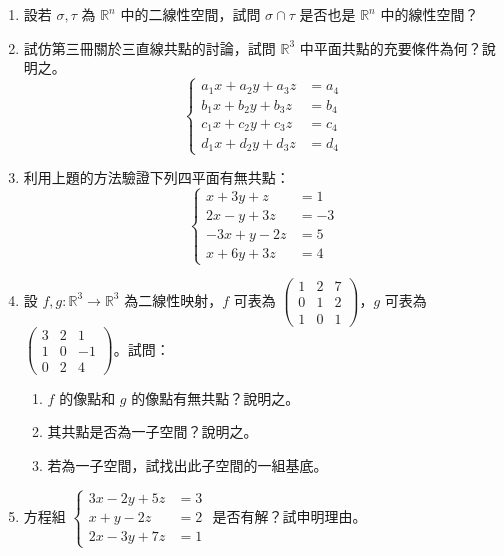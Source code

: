 \begin{enumerate}[label=\arabic*., leftmargin=2em]
  \item[\textbf{**11.}] 設若 $\sigma, \tau$ 為 $\mathbb{R}^n$ 中的二線性空間，試問 $\sigma \cap \tau$ 是否也是 $\mathbb{R}^n$ 中的線性空間？

  \item 試仿第三冊關於三直線共點的討論，試問 $\mathbb{R}^3$ 中平面共點的充要條件為何？說明之。
  \[ \left\{\begin{aligned}
  a_1x + a_2y + a_3z &= a_4 \\
  b_1x + b_2y + b_3z &= b_4 \\
  c_1x + c_2y + c_3z &= c_4 \\
  d_1x + d_2y + d_3z &= d_4
  \end{aligned}\right. \]

  \item 利用上題的方法驗證下列四平面有無共點：
  \[ \left\{\begin{aligned}
  x + 3y + z &= 1 \\
  2x - y + 3z &= -3 \\
  -3x + y - 2z &= 5 \\
  x + 6y + 3z &= 4
  \end{aligned}\right. \]

  \item[\textbf{*14.}] 設 $f, g: \mathbb{R}^3 \longrightarrow \mathbb{R}^3$ 為二線性映射，$f$ 可表為 $\begin{pmatrix} 1 & 2 & 7 \\ 0 & 1 & 2 \\ 1 & 0 & 1 \end{pmatrix}$，$g$ 可表為 $\begin{pmatrix} 3 & 2 & 1 \\ 1 & 0 & -1 \\ 0 & 2 & 4 \end{pmatrix}$。試問：
  \begin{enumerate}[label=(\roman*)]
    \item $f$ 的像點和 $g$ 的像點有無共點？說明之。
    \item 其共點是否為一子空間？說明之。
    \item 若為一子空間，試找出此子空間的一組基底。
  \end{enumerate}

  \item 方程組 $\left\{\begin{aligned}
  3x - 2y + 5z &= 3 \\
  x + y - 2z &= 2 \\
  2x - 3y + 7z &= 1
  \end{aligned}\right.$ 是否有解？試申明理由。
\end{enumerate}

